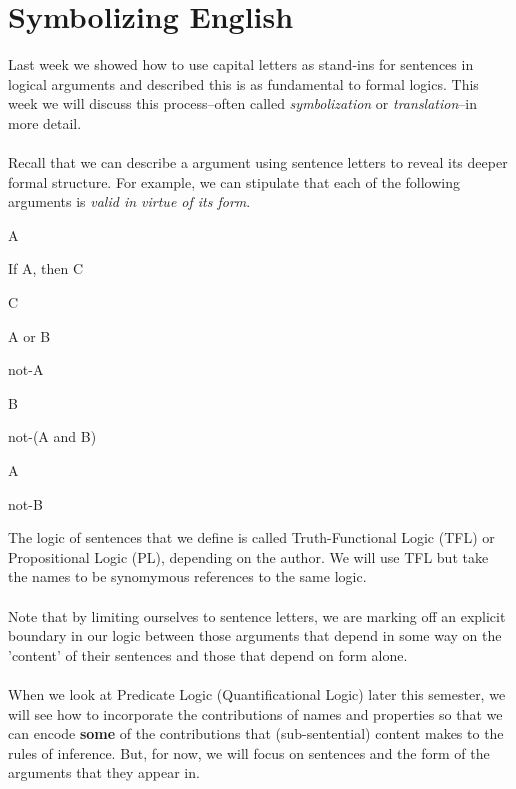 
\section{Symbolizing English}


Last week we showed how to use capital letters as stand-ins for sentences
in logical arguments and described this is as fundamental to formal logics.
This week we will discuss this process--often called \textit{symbolization}
or \textit{translation}--in more detail. 
\\ \\ 
Recall that we can describe a argument using sentence letters to reveal its
deeper formal structure. For example, we can stipulate that each of the
following arguments is \textit{valid in virtue of its form}.

\begin{argument}
\item[] A
\item[] If A, then C
\item[\therefore] C
\end{argument}

\begin{argument}
\item[] A or B
\item[] not-A
\item[\therefore] B
\end{argument}

\begin{argument}
\item[] not-(A and B)
\item[] A
\item[\therefore] not-B
\end{argument}

The logic of sentences that we define is called Truth-Functional Logic (TFL)
or Propositional Logic (PL), depending on the author. We will use TFL but take
the names to be synomymous references to the same logic.
\\ \\ 
Note that by limiting ourselves to sentence letters, we are marking off an
explicit boundary in our logic between those arguments that depend in some
way on the 'content' of their sentences and those that depend on form alone.
\\ \\
When we look at Predicate Logic (Quantificational Logic) later this semester,
we will see how to incorporate the contributions of names and properties so
that we can encode \textbf{some} of the contributions that (sub-sentential)
content makes to the rules of inference. But, for now, we will focus on
sentences and the form of the arguments that they appear in.

